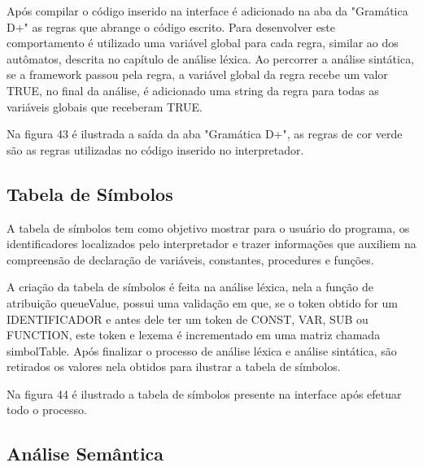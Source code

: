 \documentclass[12pt,oneside,a4paper,chapter=TITLE,section=TITLE,sumario=tradicional]{abntex2}
\begin{document}
Após compilar o código inserido na interface é adicionado na aba da "Gramática D+" as regras que abrange o código escrito. Para desenvolver este comportamento é utilizado uma variável global para cada regra, similar ao dos autômatos, descrita no capítulo de análise léxica. Ao percorrer a análise sintática, se a framework passou pela regra, a variável global da regra recebe um valor TRUE, no final da análise, é adicionado uma string da regra para todas as variáveis globais que receberam TRUE.

Na figura 43 é ilustrada a saída da aba "Gramática D+", as regras de cor verde são as regras utilizadas no código inserido no interpretador. 

\begin{figure}[htb]
\end{figure} 

\subsection{Tabela de Símbolos}
\label{subsec:tabeladesimbolos}

A tabela de símbolos tem como objetivo mostrar para o usuário do programa, os identificadores localizados pelo interpretador e trazer informações que auxiliem na compreensão de declaração de variáveis, constantes, procedures e funções.

A criação da tabela de símbolos é feita na análise léxica, nela a função de atribuição queueValue, possui uma validação em que, se o token obtido for um IDENTIFICADOR e antes dele ter um token de CONST, VAR, SUB ou FUNCTION, este token e lexema é incrementado em uma matriz chamada simbolTable. Após finalizar o processo de análise léxica e análise sintática, são retirados os valores nela obtidos para ilustrar a tabela de símbolos.

Na figura 44 é ilustrado a tabela de símbolos presente na interface após efetuar todo o processo. 

\begin{figure}[htb]
\end{figure} 

\subsection{Análise Semântica}
\label{subsec:anasemantica}
\end{document}
